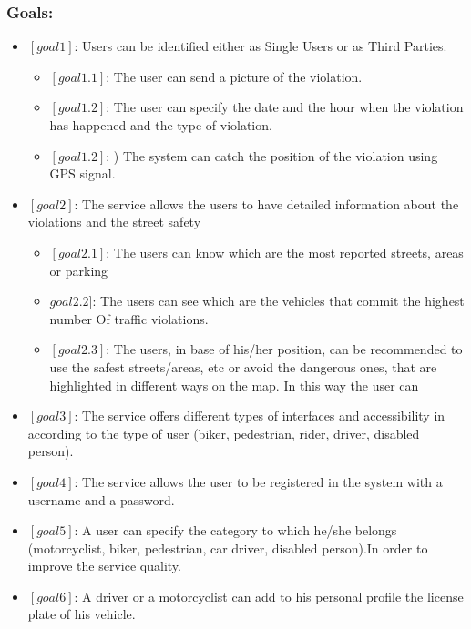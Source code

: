 \documentclass[titlepage]{article}
\begin{document}
\subsubsection{Goals:}
\begin{itemize}
\item $[goal 1]$:  Users can be identiﬁed either as Single Users or as Third Parties. 
\begin{itemize}

	\item $[goal 1.1]$: The user can send a picture of the 			violation.
	
	\item $[goal 1.2]$: The user can specify the date and the 	hour when the violation has happened
	and the type of violation.
	
	\item $[goal 1.2]$: ) The system can catch the position 		of the violation using GPS signal.
\end{itemize}
\item $[goal 2]$: The service allows the users to have detailed information about the violations and the street safety
      \begin{itemize}
      	\item $[goal 2.1]$: The users can know which are the 			most reported streets, areas or parking 
      	
      	\item $goal 2.2]$: The users can see which are the 				vehicles that commit the highest number
		Of traffic violations.
		
		\item $[goal 2.3]$: The users, in base of his/her 				position, can be recommended to use the safest 					streets/areas, etc or avoid the dangerous ones, that 			are highlighted in different ways on the map. In this 		way the user can 

      \end{itemize}
\item $[goal 3]$: The service offers different types of 						  interfaces and accessibility in according 					  to the type of user (biker, pedestrian, 						  rider, driver, disabled person).

\item $[goal 4]$: The service allows the user to be 							  registered 	in the system with a username 				  and a password.

\item $[goal 5]$: A user can specify the category to which 						  he/she belongs (motorcyclist, biker, 							  pedestrian, car driver, disabled person).In 				  order to improve the service quality.

\item $[goal 6]$: A driver or a motorcyclist can add to his 					  personal profile the license plate of his 					  vehicle.

\end{itemize}
\end{document}
